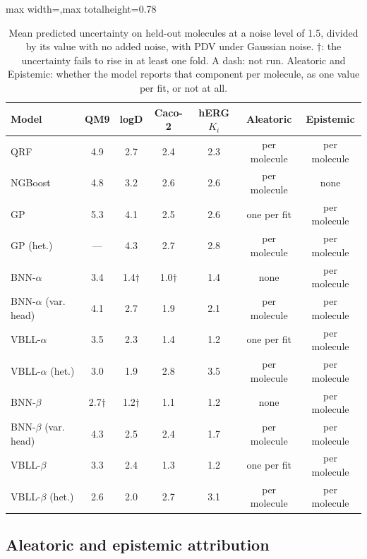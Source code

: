 \begin{table}[!htbp]
\centering
\small
\begin{adjustbox}{max width=\textwidth,max totalheight=0.78\textheight}
\begin{tabular}{lcccccc}
\toprule
Model & QM9 & logD & Caco-2 & hERG $K_i$ & Aleatoric & Epistemic \\
\midrule
QRF & 4.9 & 2.7 & 2.4 & 2.3 & per molecule & per molecule \\
NGBoost & 4.8 & 3.2 & 2.6 & 2.6 & per molecule & none \\
GP & 5.3 & 4.1 & 2.5 & 2.6 & one per fit & per molecule \\
GP (het.) & --- & 4.3 & 2.7 & 2.8 & per molecule & per molecule \\
BNN-$\alpha$ & 3.4 & 1.4$\dagger$ & 1.0$\dagger$ & 1.4 & none & per molecule \\
BNN-$\alpha$ (var. head) & 4.1 & 2.7 & 1.9 & 2.1 & per molecule & per molecule \\
VBLL-$\alpha$ & 3.5 & 2.3 & 1.4 & 1.2 & one per fit & per molecule \\
VBLL-$\alpha$ (het.) & 3.0 & 1.9 & 2.8 & 3.5 & per molecule & per molecule \\
BNN-$\beta$ & 2.7$\dagger$ & 1.2$\dagger$ & 1.1 & 1.2 & none & per molecule \\
BNN-$\beta$ (var. head) & 4.3 & 2.5 & 2.4 & 1.7 & per molecule & per molecule \\
VBLL-$\beta$ & 3.3 & 2.4 & 1.3 & 1.2 & one per fit & per molecule \\
VBLL-$\beta$ (het.) & 2.6 & 2.0 & 2.7 & 3.1 & per molecule & per molecule \\
\bottomrule
\end{tabular}
\end{adjustbox}
\caption[Rise in mean predicted uncertainty under Gaussian noise.]{Mean predicted uncertainty on held-out molecules at a noise level of 1.5, divided by its value with no added noise, with PDV under Gaussian noise. $\dagger$: the uncertainty fails to rise in at least one fold. A dash: not run. Aleatoric and Epistemic: whether the model reports that component per molecule, as one value per fit, or not at all.}
\label{tab:uncertainty_rise}
\end{table}

\subsection{Aleatoric and epistemic attribution}

